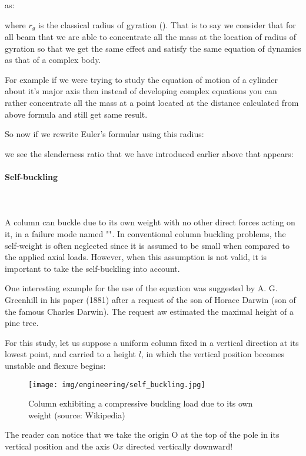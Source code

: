 	as:
	
	where $r_g$ is the classical radius of gyration (). That is to say we consider that for all beam that we are able to concentrate all the mass at the location of radius of gyration so that we get the same effect and satisfy the same equation of dynamics as that of a complex body.

	For example if we were trying to study the equation of motion of a cylinder about it's major axis then instead of developing complex equations you can rather concentrate all the mass at a point located at the distance calculated from above formula and still get same result.

	So now if we rewrite Euler's formular using this radius:
	
	we see the slenderness ratio that we have introduced earlier above that appears:
	
	
	\pagebreak
	\paragraph{Self-buckling}\mbox{}\\\\
	A column can buckle due to its own weight with no other direct forces acting on it, in a failure mode named "\label{self-buckling}". In conventional column buckling problems, the self-weight is often neglected since it is assumed to be small when compared to the applied axial loads. However, when this assumption is not valid, it is important to take the self-buckling into account.
	
	One interesting example for the use of the equation was suggested by A. G. Greenhill in his paper (1881) after a request of the son of Horace Darwin (son of the famous Charles Darwin). The request aw estimated the maximal height of a pine tree.
	
	For this study, let us suppose a uniform column fixed in a vertical direction at its lowest point, and carried to a height $l$, in which the vertical position becomes unstable and flexure begins:
	\begin{figure}[H]
		\centering
		\texttt{[image: img/engineering/self\_buckling.jpg]}
		\caption[Column exhibiting a compressive buckling load due to its own weight]{Column exhibiting a compressive buckling load due to its own weight (source: Wikipedia)}
	\end{figure}
	The reader can notice that we take the origin O at the top of the pole in its vertical position and the axis $\text{O}x$ directed vertically downward!
	
